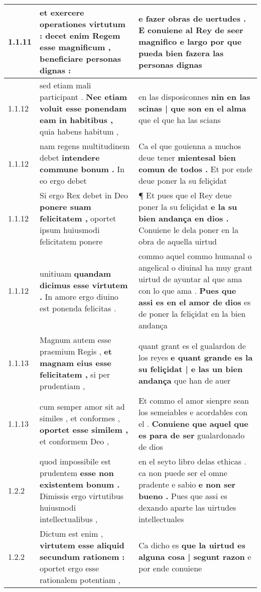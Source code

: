 \begin{tabular}{|p{1cm}|p{6.5cm}|p{6.5cm}|}
1.1.11 & et exercere operationes virtutum : \textbf{ decet enim Regem esse magnificum , } beneficiare personas dignas : & e fazer obras de uertudes . \textbf{ E conuiene al Rey de seer magnifico e largo } por que pueda bien fazera las personas dignas \\\hline
1.1.12 & sed etiam mali participant . \textbf{ Nec etiam voluit esse ponendam eam in habitibus , } quia habens habitum , & en las disposiconnes \textbf{ nin en las scinas | que son en el alma } que el que ha las scians \\\hline
1.1.12 & nam regens multitudinem debet \textbf{ intendere commune bonum . } In eo ergo debet & Ca el que gouienna a muchos deue tener \textbf{ mientesal bien comun de todos . } Et por ende deue poner la su feliçidat \\\hline
1.1.12 & Si ergo Rex debet in Deo \textbf{ ponere suam felicitatem , } oportet ipsum huiusmodi felicitatem ponere & ¶ Et pues que el Rey deue poner la su feliçidat \textbf{ e la su bien andança en dios . } Conuiene le dela poner en la obra de aquella uirtud \\\hline
1.1.12 & unitiuam \textbf{ quandam dicimus esse virtutem . } In amore ergo diuino est ponenda felicitas . & commo aquel commo humanal o angelical o diuinal ha muy grant uirtud de ayuntar al que ama con lo que ama . \textbf{ Pues que assi es en el amor de dios } es de poner la feliçidat en la bien andança \\\hline
1.1.13 & Magnum autem esse praemium Regis , \textbf{ et magnam eius esse felicitatem , } si per prudentiam , & quant grant es el gualardon de los reyes \textbf{ e quant grande es la su feliçidat | e las un bien andança } que han de auer \\\hline
1.1.13 & cum semper amor sit ad similes , et conformes , \textbf{ oportet esse similem , } et conformem Deo , & Et commo el amor sienpre sean los semeiables e acordables con el . \textbf{ Conuiene que aquel que es para de ser } gualardonado de dios \\\hline
1.2.2 & quod impossibile est prudentem \textbf{ esse non existentem bonum . } Dimissis ergo virtutibus huiusmodi intellectualibus , & en el seyto libro delas ethicas . ca non puede ser el omne pradente e sabio \textbf{ e non ser bueno . } Pues que assi es dexando aparte las uirtudes intellectuales \\\hline
1.2.2 & Dictum est enim , \textbf{ virtutem esse aliquid secundum rationem : } oportet ergo esse rationalem potentiam , & Ca dicho es \textbf{ que la uirtud es alguna cosa | segunt razon } e por ende conuiene \\\hline

\end{tabular}

